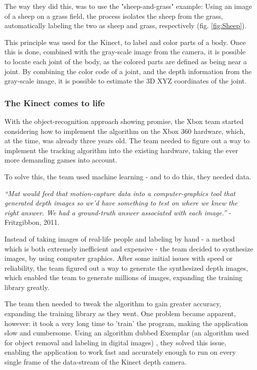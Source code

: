 The way they did this, was to use the "sheep-and-grass" example:
Using an image of a sheep on a grass field, the process isolates the sheep from the grass, automatically labeling the two as sheep and grass, respectively  (fig. \ref{fig:Sheep}).
\bigskip

This principle was used for the Kinect, to label and color parts of a body. Once this is done, combined with the gray-scale image from the camera, it is possible to locate each joint of the body, as the colored parts are defined as being near a joint. By combining the color code of a joint, and the depth information from the gray-scale image, it is possible to estimate the 3D XYZ coordinates of the joint.

\subsubsection*{The Kinect comes to life}
With the object-recognition approach showing promise, the Xbox team started considering how to implement the algorithm on the Xbox 360 hardware, which, at the time, was already three years old. The team needed to figure out a way to implement the tracking algorithm into the existing hardware, taking the ever more demanding games into account.

To solve this, the team used machine learning - and to do this, they needed data.	
\bigskip

\textit{“Mat would feed that motion-capture data into a computer-graphics tool that generated depth images so we’d have something to test on where we knew the right answer. We had a ground-truth answer associated with each image.”} - Fritzgibbon, 2011.
\bigskip

Instead of taking images of real-life people and labeling by hand - a method which is both extremely inefficient and expensive - the team decided to synthesize images, by using computer graphics. After some initial issues with speed or reliability, the team figured out a way to generate the synthesized depth images, which enabled the team to generate millions of images, expanding the training library greatly.

The team then needed to tweak the algorithm to gain greater accuracy, expanding the training library as they went. One problem became apparent, however: it took a very long time to 'train' the program, making the application slow and cumbersome. Using an algorithm dubbed Exemplar (an algorithm used for object removal and labeling in digital images) \parencite{Cheng2005}, they solved this issue, enabling the application to work fast and accurately enough to run on every single frame of the data-stream of the Kinect depth camera.


